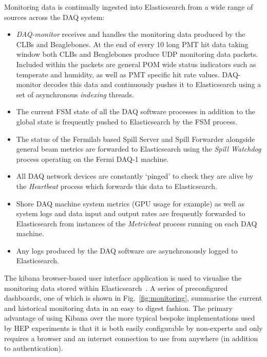 Monitoring data is continually ingested into Elasticsearch from a wide range of sources across the
\chipsfive DAQ system:
\begin{itemize}
    \item \emph{DAQ-monitor} receives and handles the monitoring data produced by the CLBs and
    Beaglebones. At the end of every \unit{10}{} long PMT hit data taking window both
    CLBs and Beaglebones produce UDP monitoring data packets. Included within the packets are
    general POM wide status indicators such as temperate and humidity, as well as PMT specific hit
    rate values. DAQ-monitor decodes this data and continuously pushes it to Elasticsearch using a
    set of asynchronous \emph{indexing} threads.
    \item The current FSM state of all the DAQ software processes in addition to the global state
    is frequently pushed to Elasticsearch by the FSM process.
    \item The status of the Fermilab based Spill Server and Spill Forwarder alongside general
    \numi beam metrics are forwarded to Elasticsearch using the \emph{Spill Watchdog} process
    operating on the Fermi DAQ-1 machine.
    \item All DAQ network devices are constantly `pinged' to check they are alive by the
    \emph{Heartbeat} process which forwards this data to Elasticsearch.
    \item Shore DAQ machine system metrics (GPU usage for example) as well as system logs and data
    input and output rates are frequently forwarded to Elasticsearch from instances of the
    \emph{Metricbeat} process running on each DAQ machine.
    \item Any logs produced by the DAQ software are asynchronously logged to Elasticsearch.
\end{itemize}

The kibana browser-based user interface application is used to visualise the monitoring data
stored within Elasticsearch~\cite{kibana2020}. A series of preconfigured dashboards, one of which
is shown in Fig.~\ref{fig:monitoring}, summarise the current and historical monitoring data in an
easy to digest fashion. The primary advantage of using Kibana over the more typical bespoke
implementations used by HEP experiments is that it is both easily configurable by non-experts and
only requires a browser and an internet connection to use from anywhere (in addition to
authentication).


